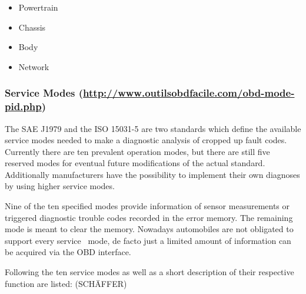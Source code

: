 \begin{itemize}
\tightlist
\item
  {Powertrain }
\item
  {Chassis }
\item
  {Body }
\item
  {Network}
\end{itemize}

{}

\hypertarget{h.4dw71h9dkw49}{\subsubsection{\texorpdfstring{{Service
Modes
(}{\href{https://www.google.com/url?q=http://www.outilsobdfacile.com/obd-mode-pid.php\&sa=D\&ust=1460827923541000\&usg=AFQjCNE_qtQlDnkhOBGyVntWEurcqPSKpQ}{http://www.outilsobdfacile.com/obd-mode-pid.php}}{)}}{Service Modes (http://www.outilsobdfacile.com/obd-mode-pid.php)}}\label{h.4dw71h9dkw49}}

{The SAE J1979 and the ISO 15031-5 are two standards which define the
available service modes needed to make a diagnostic analysis of cropped
up fault codes. Currently there are ten prevalent operation modes, but
there are still five reserved modes for eventual future modifications of
the actual standard. Additionally manufacturers have the possibility to
implement their own diagnoses by using higher service mode}{s.}

{Nine of the ten specified modes provide information of sensor
measurements or triggered diagnostic trouble codes recorded in the error
memory. The remaining mode is meant to clear the memory. Nowadays
automobiles are not obligated to support every service ~mode, de facto
just a limited amount of information can be acquired via the OBD
interface.}

{Following the ten service modes as well as a short description of their
respective function are listed: (SCHÄFFER)}

{}

